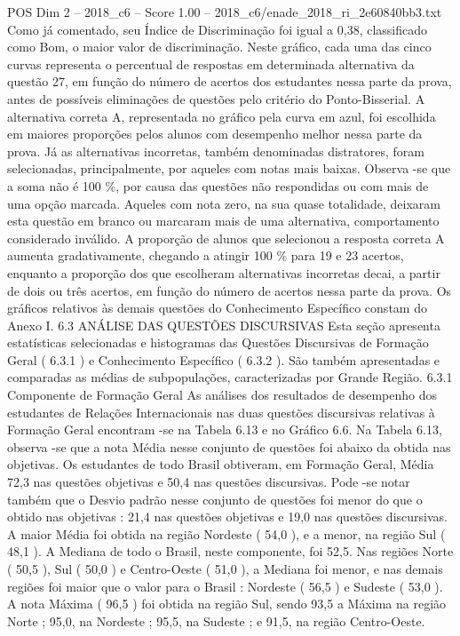 \begin{textsample}{POS Dim 2 – 2018\_c6 – Score 1.00 – 2018\_c6/enade\_2018\_ri\_2e60840bb3.txt}
Como já comentado, seu Índice de Discriminação foi igual a 0,38, classificado como Bom, o maior valor de discriminação.
Neste gráfico, cada uma das cinco curvas representa o percentual de respostas em determinada alternativa da questão 27, em função do número de acertos dos estudantes nessa parte da prova, antes de possíveis eliminações de questões pelo critério do Ponto-Bisserial.
A alternativa correta A, representada no gráfico pela curva em azul, foi escolhida em maiores proporções pelos alunos com desempenho melhor nessa parte da prova.
Já as alternativas incorretas, também denominadas distratores, foram selecionadas, principalmente, por aqueles com notas mais baixas.
Observa -se que a soma não é 100 \%, por causa das questões não respondidas ou com mais de uma opção marcada.
Aqueles com nota zero, na sua quase totalidade, deixaram esta questão em branco ou marcaram mais de uma alternativa, comportamento considerado inválido.
A proporção de alunos que selecionou a resposta correta A aumenta gradativamente, chegando a atingir 100 \% para 19 e 23 acertos, enquanto a proporção dos que escolheram alternativas incorretas decai, a partir de dois ou três acertos, em função do número de acertos nessa parte da prova.
Os gráficos relativos às demais questões do Conhecimento Específico constam do Anexo I. 6.3 ANÁLISE DAS QUESTÕES DISCURSIVAS Esta seção apresenta estatísticas selecionadas e histogramas das Questões Discursivas de Formação Geral ( 6.3.1 ) e Conhecimento Específico ( 6.3.2 ).
São também apresentadas e comparadas as médias de subpopulações, caracterizadas por Grande Região. 6.3.1 Componente de Formação Geral As análises dos resultados de desempenho dos estudantes de Relações Internacionais nas duas questões discursivas relativas à Formação Geral encontram -se na Tabela 6.13 e no Gráfico 6.6.
Na Tabela 6.13, observa -se que a nota Média nesse conjunto de questões foi abaixo da obtida nas objetivas.
Os estudantes de todo Brasil obtiveram, em Formação Geral, Média 72,3 nas questões objetivas e 50,4 nas questões discursivas.
Pode -se notar também que o Desvio padrão nesse conjunto de questões foi menor do que o obtido nas objetivas : 21,4 nas questões objetivas e 19,0 nas questões discursivas.
A maior Média foi obtida na região Nordeste ( 54,0 ), e a menor, na região Sul ( 48,1 ).
A Mediana de todo o Brasil, neste componente, foi 52,5.
Nas regiões Norte ( 50,5 ), Sul ( 50,0 ) e Centro-Oeste ( 51,0 ), a Mediana foi menor, e nas demais regiões foi maior que o valor para o Brasil : Nordeste ( 56,5 ) e Sudeste ( 53,0 ).
A nota Máxima ( 96,5 ) foi obtida na região Sul, sendo 93,5 a Máxima na região Norte ; 95,0, na Nordeste ; 95,5, na Sudeste ; e 91,5, na região Centro-Oeste.

\end{textsample}
